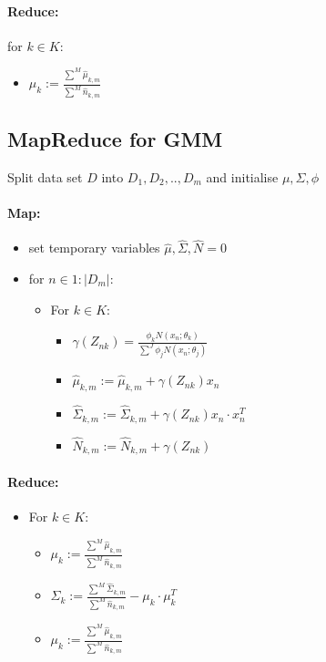\documentclass[]{article}
\begin{document}
\paragraph{Reduce:\\}
\textnormal{for $k \in K$:}
	\begin{itemize}
		\item $\mu_k := \frac{ \sum^M \hat \mu_{k,m} } { \sum^M  \hat n_{k,m}}$
	\end{itemize}

\newpage
\subsection{MapReduce for GMM}

	\textnormal{Split data set $D$ into $D_1, D_2, .., D_m$ and initialise $\mu, \Sigma, \phi$\\}
	\paragraph{Map:}
	\begin{itemize}
		\item set temporary variables $\hat \mu, \hat \Sigma, \hat N = 0$
		\item for $n \in 1:|D_m|$:
		\begin{itemize}
			\item For $k \in K$:
			\begin{itemize}
				\item $\gamma(Z_{nk}) = \frac{ \phi_k N(x_n;\theta_k)}{ \sum^J \phi_j N(x_n ; \theta_j) }$
				\item $\hat \mu_{k,m} := \hat \mu_{k,m} + \gamma(Z_{nk})x_n$
				\item $\hat \Sigma_{k,m} := \hat \Sigma_{k,m} + \gamma(Z_{nk})x_n\cdot x_n^T$
				\item $\hat N_{k,m} := \hat N_{k,m} + \gamma(Z_{nk})$
			\end{itemize}
		\end{itemize}
	\end{itemize}
	\paragraph{Reduce:}
		\begin{itemize}
			\item For $k \in K$:
			\begin{itemize}
				\item $\mu_k := \frac{ \sum^M \hat \mu_{k,m} } { \sum^M  \hat n_{k,m}}$
				\item $\Sigma_k := \frac{ \sum^M \hat \Sigma_{k,m} } { \sum^M  \hat n_{k,m}} - \mu_k \cdot \mu_k^T$
				\item $\mu_k := \frac{ \sum^M \hat \mu_{k,m} } { \sum^M  \hat n_{k,m}}$
			\end{itemize}
	\end{itemize}
\end{document}

